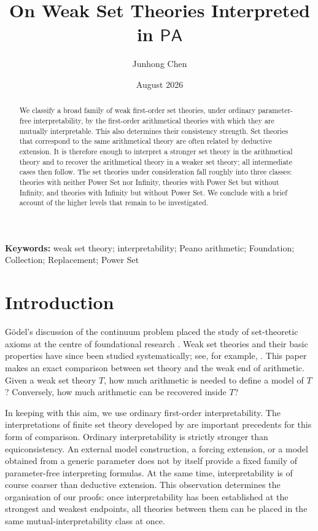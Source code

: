 \documentclass[11pt,a4paper]{article}
\title{On Weak Set Theories Interpreted in \(\mathsf{PA}\)}
\author{Junhong Chen}
\date{August 2026}
\theoremstyle{plain}
\theoremstyle{definition}
\theoremstyle{remark}
\begin{document}
\maketitle

\begin{abstract}
We classify a broad family of weak first-order set theories, under ordinary parameter-free interpretability, by the first-order arithmetical theories with which they are mutually interpretable. This also determines their consistency strength. Set theories that correspond to the same arithmetical theory are often related by deductive extension. It is therefore enough to interpret a stronger set theory in the arithmetical theory and to recover the arithmetical theory in a weaker set theory; all intermediate cases then follow. The set theories under consideration fall roughly into three classes: theories with neither Power Set nor Infinity, theories with Power Set but without Infinity, and theories with Infinity but without Power Set. We conclude with a brief account of the higher levels that remain to be investigated.
\end{abstract}

\noindent\textbf{Keywords:}
weak set theory; interpretability; Peano arithmetic; Foundation; Collection; Replacement; Power Set

\section{Introduction}

G\"odel's discussion of the continuum problem placed the study of set-theoretic axioms at the centre of foundational research \citep{Godel1947}. Weak set theories and their basic properties have since been studied systematically; see, for example, \citep{Mathias2001,Mathias2007}. This paper makes an exact comparison between set theory and the weak end of arithmetic. Given a weak set theory \(T\), how much arithmetic is needed to define a model of \(T\)? Conversely, how much arithmetic can be recovered inside \(T\)?

In keeping with this aim, we use ordinary first-order interpretability. The interpretations of finite set theory developed by \citet{KayeWong2007,Pettigrew2009} are important precedents for this form of comparison. Ordinary interpretability is strictly stronger than equiconsistency. An external model construction, a forcing extension, or a model obtained from a generic parameter does not by itself provide a fixed family of parameter-free interpreting formulas. At the same time, interpretability is of course coarser than deductive extension. This observation determines the organisation of our proofs: once interpretability has been established at the strongest and weakest endpoints, all theories between them can be placed in the same mutual-interpretability class at once.
\end{document}
